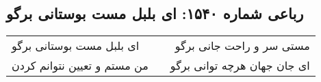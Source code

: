 \begin{center}
\section*{رباعی شماره ۱۵۴۰: ای بلبل مست بوستانی برگو}
\label{sec:1540}
\begin{longtable}{l p{0.5cm} r}
ای بلبل مست بوستانی برگو
&&
مستی سر و راحت جانی برگو
\\
من مستم و تعیین نتوانم کردن
&&
ای جان جهان هرچه توانی برگو
\\
\end{longtable}
\end{center}
